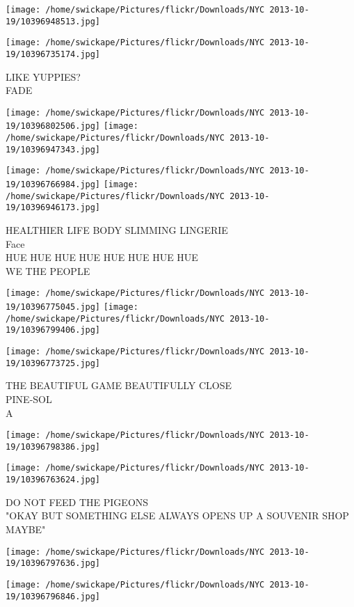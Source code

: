 \documentclass[10pt,letterpaper]{article}
\begin{document}
\texttt{[image: /home/swickape/Pictures/flickr/Downloads/NYC 2013-10-19/10396948513.jpg]}

\vspace{0.25in}
\texttt{[image: /home/swickape/Pictures/flickr/Downloads/NYC 2013-10-19/10396735174.jpg]}

LIKE YUPPIES?\\
FADE
\pagebreak

\texttt{[image: /home/swickape/Pictures/flickr/Downloads/NYC 2013-10-19/10396802506.jpg]}
\texttt{[image: /home/swickape/Pictures/flickr/Downloads/NYC 2013-10-19/10396947343.jpg]}

\texttt{[image: /home/swickape/Pictures/flickr/Downloads/NYC 2013-10-19/10396766984.jpg]}
\texttt{[image: /home/swickape/Pictures/flickr/Downloads/NYC 2013-10-19/10396946173.jpg]}

HEALTHIER LIFE BODY SLIMMING LINGERIE\\
Face\\
HUE HUE HUE HUE HUE HUE HUE HUE\\
WE THE PEOPLE
\pagebreak

\texttt{[image: /home/swickape/Pictures/flickr/Downloads/NYC 2013-10-19/10396775045.jpg]}
\texttt{[image: /home/swickape/Pictures/flickr/Downloads/NYC 2013-10-19/10396799406.jpg]}

\texttt{[image: /home/swickape/Pictures/flickr/Downloads/NYC 2013-10-19/10396773725.jpg]}

THE BEAUTIFUL GAME BEAUTIFULLY CLOSE\\
PINE{-}SOL\\
A
\pagebreak

\texttt{[image: /home/swickape/Pictures/flickr/Downloads/NYC 2013-10-19/10396798386.jpg]}

\vspace{0.25in}
\texttt{[image: /home/swickape/Pictures/flickr/Downloads/NYC 2013-10-19/10396763624.jpg]}

DO NOT FEED THE PIGEONS\\
"OKAY BUT SOMETHING ELSE ALWAYS OPENS UP A SOUVENIR SHOP MAYBE"
\pagebreak

\texttt{[image: /home/swickape/Pictures/flickr/Downloads/NYC 2013-10-19/10396797636.jpg]}

\vspace{0.25in}
\texttt{[image: /home/swickape/Pictures/flickr/Downloads/NYC 2013-10-19/10396796846.jpg]}
\end{document}
